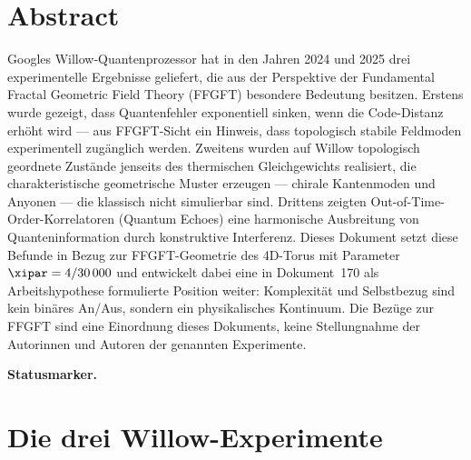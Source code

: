 
\section*{Abstract}

Googles Willow-Quantenprozessor hat in den Jahren 2024 und 2025 drei experimentelle
Ergebnisse geliefert, die aus der Perspektive der Fundamental Fractal Geometric Field
Theory (FFGFT) besondere Bedeutung besitzen. Erstens wurde gezeigt, dass
Quantenfehler exponentiell sinken, wenn die Code-Distanz erhöht wird — aus
FFGFT-Sicht ein Hinweis, dass topologisch stabile Feldmoden experimentell zugänglich werden.
Zweitens wurden auf Willow topologisch geordnete Zustände jenseits des thermischen
Gleichgewichts realisiert, die charakteristische geometrische Muster erzeugen —
chirale Kantenmoden und Anyonen — die klassisch nicht simulierbar sind.
Drittens zeigten Out-of-Time-Order-Korrelatoren (Quantum Echoes) eine harmonische
Ausbreitung von Quanteninformation durch konstruktive Interferenz.
Dieses Dokument setzt diese Befunde in Bezug zur FFGFT-Geometrie des 4D-Torus
mit Parameter $\xipar = 4/30\,000$ und entwickelt dabei eine in Dokument~170
als Arbeitshypothese formulierte Position weiter: Komplexität und Selbstbezug
sind kein binäres An/Aus, sondern ein physikalisches Kontinuum.
Die Bezüge zur FFGFT sind eine Einordnung dieses Dokuments, keine Stellungnahme
der Autorinnen und Autoren der genannten Experimente.

\medskip\noindent\textbf{Statusmarker.}


\clearpage

\section{Die drei Willow-Experimente}

